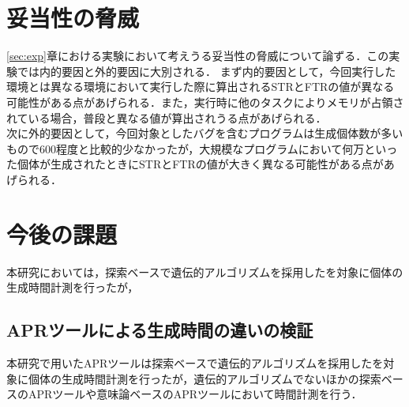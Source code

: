 \documentclass[uplatex,dvipdfmx,a4paper]{jsarticle}
\begin{document}
\clearpage
\section{妥当性の脅威}\label{sec:threat}
\ref{sec:exp}章における実験において考えうる妥当性の脅威について論ずる．この実験では内的要因と外的要因に大別される．
まず内的要因として，今回実行した環境とは異なる環境において実行した際に算出されるSTRとFTRの値が異なる可能性がある点があげられる．また，実行時に他のタスクによりメモリが占領されている場合，普段と異なる値が算出されうる点があげられる．\\
次に外的要因として，今回対象としたバグを含むプログラムは生成個体数が多いもので600程度と比較的少なかったが，大規模なプログラムにおいて何万といった個体が生成されたときにSTRとFTRの値が大きく異なる可能性がある点があげられる．
\clearpage
\section{今後の課題}\label{sec:ftrclg}
本研究においては，探索ベースで遺伝的アルゴリズムを採用した\kgp を対象に個体の生成時間計測を行ったが，
\subsection{APRツールによる生成時間の違いの検証}
本研究で用いたAPRツールは探索ベースで遺伝的アルゴリズムを採用した\kgp を対象に個体の生成時間計測を行ったが，遺伝的アルゴリズムでないほかの探索ベースのAPRツールや意味論ベースのAPRツールにおいて時間計測を行う．
\end{document}
